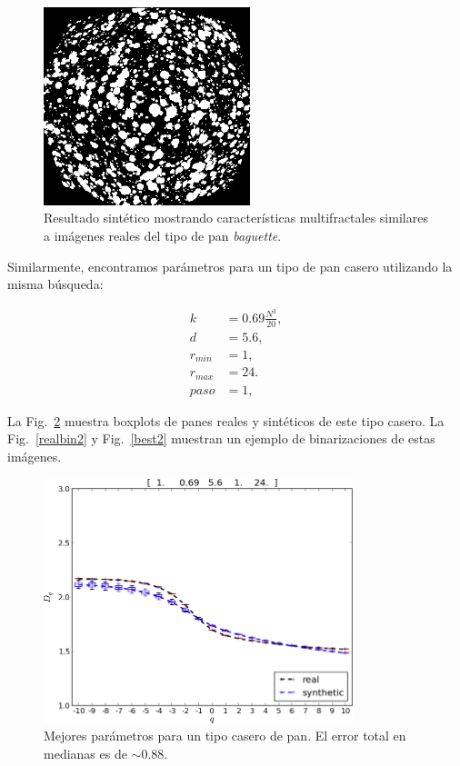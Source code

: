 \begin{figure}[!ht]
\begin{center}
\includegraphics[width=6cm]{figures/best}
\caption{Resultado sintético mostrando características multifractales similares a imágenes reales del tipo de pan {\em baguette}.}
\label{best}
\end{center}
\end{figure}

Similarmente, encontramos parámetros para un tipo de pan casero utilizando la misma búsqueda:

\begin{align*}
k &= 0.69 \frac{N^{3}}{20} ,\\
d &=5.6,\\
r_{min} &=1,\\
r_{max} &=24.\\
paso &=1,
\end{align*}

La Fig.~\ref{bestboxplot2} muestra boxplots de panes reales y sintéticos de este tipo casero.
La Fig.~\ref{realbin2} y  Fig.~\ref{best2} muestran un ejemplo de binarizaciones de estas imágenes. 


\begin{figure}[!ht]
\includegraphics[width=9cm]{figures/bestboxplot2}
\caption{Mejores parámetros para un tipo casero de pan. El error total en medianas es de $\sim 0.88$.}
\label{bestboxplot2}
\end{figure}

